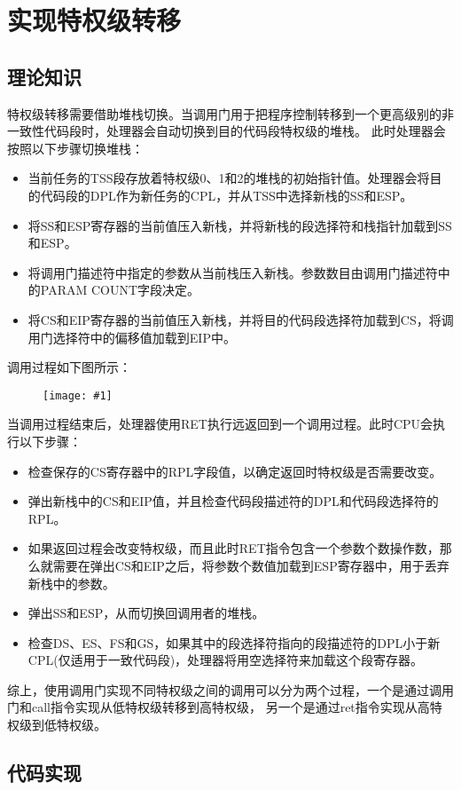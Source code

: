 \documentclass[a4paper,left=2.5cm,right=2.5cm,11pt]{article}
\newcommand{\fic}[1]{\begin{figure}[H]
		\center
		\texttt{[image: \#1]}
	\end{figure}}
\begin{document}
\section{实现特权级转移}
\subsection{理论知识}
	特权级转移需要借助堆栈切换。当调用门用于把程序控制转移到一个更高级别的非一致性代码段时，处理器会自动切换到目的代码段特权级的堆栈。
	此时处理器会按照以下步骤切换堆栈：
	\begin{itemize}
		\item 当前任务的TSS段存放着特权级0、1和2的堆栈的初始指针值。处理器会将目的代码段的DPL作为新任务的CPL，并从TSS中选择新栈的SS和ESP。
		\item 将SS和ESP寄存器的当前值压入新栈，并将新栈的段选择符和栈指针加载到SS和ESP。
		\item 将调用门描述符中指定的参数从当前栈压入新栈。参数数目由调用门描述符中的PARAM COUNT字段决定。
		\item 将CS和EIP寄存器的当前值压入新栈，并将目的代码段选择符加载到CS，将调用门选择符中的偏移值加载到EIP中。
	\end{itemize}

	调用过程如下图所示：
	\fic{1.png}

	当调用过程结束后，处理器使用RET执行远返回到一个调用过程。此时CPU会执行以下步骤：
	\begin{itemize}
		\item 检查保存的CS寄存器中的RPL字段值，以确定返回时特权级是否需要改变。
		\item 弹出新栈中的CS和EIP值，并且检查代码段描述符的DPL和代码段选择符的RPL。
		\item 如果返回过程会改变特权级，而且此时RET指令包含一个参数个数操作数，那么就需要在弹出CS和EIP之后，将参数个数值加载到ESP寄存器中，用于丢弃新栈中的参数。
		\item 弹出SS和ESP，从而切换回调用者的堆栈。
		\item 检查DS、ES、FS和GS，如果其中的段选择符指向的段描述符的DPL小于新CPL(仅适用于一致代码段)，处理器将用空选择符来加载这个段寄存器。
	\end{itemize}

	综上，使用调用门实现不同特权级之间的调用可以分为两个过程，一个是通过调用门和call指令实现从低特权级转移到高特权级，
	另一个是通过ret指令实现从高特权级到低特权级。

\subsection{代码实现}
\end{document}

